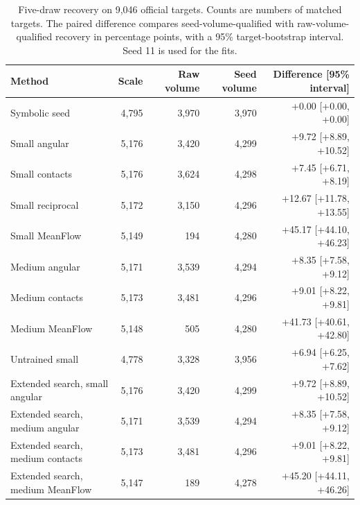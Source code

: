 \begin{table}[htbp]\centering\small\setlength{\tabcolsep}{4pt}

\caption{Five-draw recovery on 9,046 official targets. Counts are numbers of matched targets. The paired difference compares seed-volume-qualified with raw-volume-qualified recovery in percentage points, with a 95\% target-bootstrap interval. Seed 11 is used for the fits.}\label{tab:geometry-volume}

\begin{tabular}{lrrrr}\hline

Method & Scale & Raw volume & Seed volume & Difference [95\% interval]\\\hline

Symbolic seed & 4,795 & 3,970 & 3,970 & +0.00 [+0.00, +0.00]\\

Small angular & 5,176 & 3,420 & 4,299 & +9.72 [+8.89, +10.52]\\

Small contacts & 5,176 & 3,624 & 4,298 & +7.45 [+6.71, +8.19]\\

Small reciprocal & 5,172 & 3,150 & 4,296 & +12.67 [+11.78, +13.55]\\

Small MeanFlow & 5,149 & 194 & 4,280 & +45.17 [+44.10, +46.23]\\

Medium angular & 5,171 & 3,539 & 4,294 & +8.35 [+7.58, +9.12]\\

Medium contacts & 5,173 & 3,481 & 4,296 & +9.01 [+8.22, +9.81]\\

Medium MeanFlow & 5,148 & 505 & 4,280 & +41.73 [+40.61, +42.80]\\

Untrained small & 4,778 & 3,328 & 3,956 & +6.94 [+6.25, +7.62]\\

Extended search, small angular & 5,176 & 3,420 & 4,299 & +9.72 [+8.89, +10.52]\\

Extended search, medium angular & 5,171 & 3,539 & 4,294 & +8.35 [+7.58, +9.12]\\

Extended search, medium contacts & 5,173 & 3,481 & 4,296 & +9.01 [+8.22, +9.81]\\

Extended search, medium MeanFlow & 5,147 & 189 & 4,278 & +45.20 [+44.11, +46.26]\\

\hline\end{tabular}\end{table}

